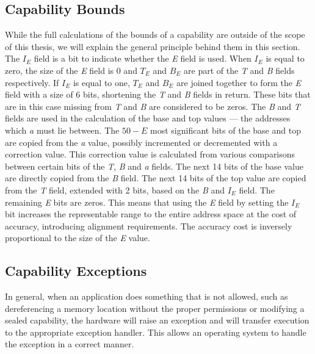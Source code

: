 \subsection{Capability Bounds}
\label{sec:bounds}
While the full calculations of the bounds of a capability are outside of the scope of this thesis, we will explain the general principle behind them in this section. The $I_E$ field is a bit to indicate whether the \textit{E} field is used. When $I_E$ is equal to zero, the size of the \textit{E} field is 0 and $T_E$ and $B_E$ are part of the \textit{T} and \textit{B} fields respectively. If $I_E$ is equal to one, $T_E$ and $B_E$ are joined together to form the \textit{E} field with a size of 6 bits, shortening the \textit{T} and \textit{B} fields in return. These bits that are in this case missing from \textit{T} and \textit{B} are considered to be zeros. The \textit{B} and \textit{T} fields are used in the calculation of the base and top values --- the addresses which \textit{a} must lie between. The $50 - E$ most significant bits of the base and top are copied from the \textit{a} value, possibly incremented or decremented with a correction value. This correction value is calculated from various comparisons between certain bits of the \textit{T}, \textit{B} and \textit{a} fields. The next 14 bits of the base value are directly copied from the \textit{B} field. The next 14 bits of the top value are copied from the \textit{T} field, extended with 2 bits, based on the \textit{B} and $I_E$ field. The remaining \textit{E} bits are zeros. This means that using the \textit{E} field by setting the $I_E$ bit increases the representable range to the entire address space at the cost of accuracy, introducing alignment requirements. The accuracy cost is inversely proportional to the size of the \textit{E} value.

\subsection{Capability Exceptions}
In general, when an application does something that is not allowed, such as dereferencing a memory location without the proper permissions or modifying a sealed capability, the hardware will raise an exception and will transfer execution to the appropriate exception handler. This allows an operating system to handle the exception in a correct manner.

